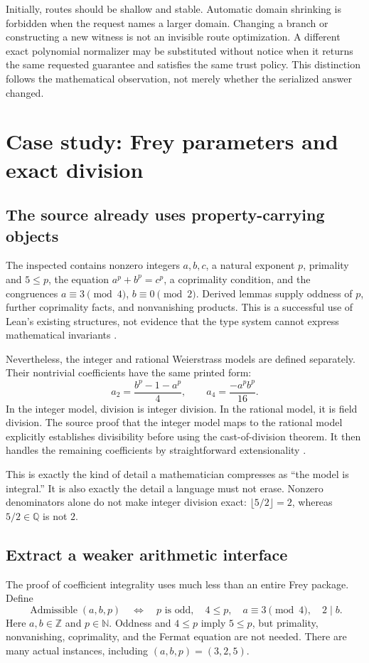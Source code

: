 \documentclass[11pt,a4paper]{article}
\newcommand{\code}[1]{\texttt{\detokenize{#1}}}
\newcommand{\N}{\mathbb N}\newcommand{\Z}{\mathbb Z}
\newcommand{\Q}{\mathbb Q}\newcommand{\R}{\mathbb R}
\theoremstyle{plain}\newtheorem{proposition}{Proposition}[section]
\theoremstyle{definition}\newtheorem{definition}[proposition]{Definition}
\theoremstyle{remark}\newtheorem{remark}[proposition]{Remark}
\begin{document}
Initially, routes should be shallow and stable. Automatic domain shrinking is forbidden when the request names a larger domain. Changing a branch or constructing a new witness is not an invisible route optimization. A different exact polynomial normalizer may be substituted without notice when it returns the same requested guarantee and satisfies the same trust policy. This distinction follows the mathematical observation, not merely whether the serialized answer changed.

\section{Case study: Frey parameters and exact division}\label{sec:frey}
\subsection{The source already uses property-carrying objects}
The inspected \code{FreyPackage} contains nonzero integers \(a,b,c\), a natural exponent \(p\), primality and \(5\le p\), the equation \(a^p+b^p=c^p\), a coprimality condition, and the congruences \(a\equiv3\pmod4\), \(b\equiv0\pmod2\). Derived lemmas supply oddness of \(p\), further coprimality facts, and nonvanishing products. This is a successful use of Lean's existing structures, not evidence that the type system cannot express mathematical invariants \cite{freydef}.

Nevertheless, the integer and rational Weierstrass models are defined separately. Their nontrivial coefficients have the same printed form:
\[
 a_2=\frac{b^p-1-a^p}{4},\qquad
 a_4=\frac{-a^p b^p}{16}.
\]
In the integer model, division is integer division. In the rational model, it is field division. The source proof that the integer model maps to the rational model explicitly establishes divisibility before using the cast-of-division theorem. It then handles the remaining coefficients by straightforward extensionality \cite{freymap}.

This is exactly the kind of detail a mathematician compresses as ``the model is integral.'' It is also exactly the detail a language must not erase. Nonzero denominators alone do not make integer division exact: \(\lfloor5/2\rfloor=2\), whereas \(5/2\in\Q\) is not \(2\).

\subsection{Extract a weaker arithmetic interface}
The proof of coefficient integrality uses much less than an entire Frey package. Define
\[
 \operatorname{Admissible}(a,b,p)\quad\Longleftrightarrow\quad
 p\text{ is odd},\quad 4\le p,\quad
 a\equiv3\pmod4,\quad 2\mid b.
\]
Here \(a,b\in\Z\) and \(p\in\N\). Oddness and \(4\le p\) imply \(5\le p\), but primality, nonvanishing, coprimality, and the Fermat equation are not needed. There are many actual instances, including \((a,b,p)=(3,2,5)\).
\end{document}
